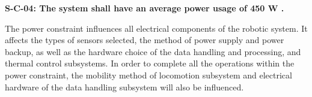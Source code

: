 \textbf{S-C-04: The system shall have an average power usage of 450 \gls{W} \cite{RFP}.}

The power constraint influences all electrical components of the robotic system. It affects the types of sensors selected, the method of power supply and power backup, as well as the hardware choice of the data handling and processing, and thermal control subsystems. In order to complete all the operations within the power constraint, the mobility method of locomotion subsystem and electrical hardware of the data handling subsystem will also be influenced.